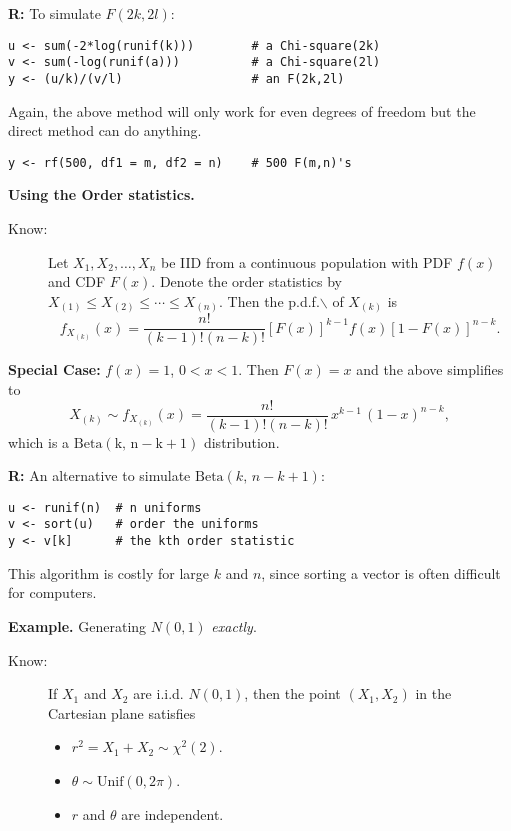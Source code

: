 \documentclass[11pt,english]{scrbook}
\begin{document}
\begin{enumerate}
\textbf{R:} To simulate \(F(2k,2l)\):
\begin{verbatim}
u <- sum(-2*log(runif(k)))        # a Chi-square(2k)
v <- sum(-log(runif(a)))          # a Chi-square(2l)
y <- (u/k)/(v/l)                  # an F(2k,2l)
\end{verbatim}

Again, the above method will only work for even degrees of freedom but the direct method can do anything.
\begin{verbatim}
y <- rf(500, df1 = m, df2 = n)    # 500 F(m,n)'s
\end{verbatim}



\textbf{Using the Order statistics.}

\begin{description}
\item[{Know:}] Let \(X_{1},X_{2},\ldots,X_{n}\) be IID from a continuous population with PDF \(f(x)\) and CDF \(F(x)\). Denote the order statistics by \(X_{(1)}\leq X_{(2)}\leq\cdots\leq X_{(n)}\). Then the p.d.f.$\backslash$ of \(X_{(k)}\) is 
\[
  f_{X_{(k)}}(x)=\frac{n!}{(k-1)!(n-k)!}[F(x)]^{k-1}f(x)[1-F(x)]^{n-k}.
  \]
\end{description}


\textbf{Special Case:} \(f(x)=1\), \(0 < x < 1\).   Then \(F(x)=x\) and the above simplifies to 
\[
X_{(k)}\sim f_{X_{(k)}}(x)=\frac{n!}{(k-1)!(n-k)!}\, x^{k-1}\,(1-x)^{n-k},
\]
which is a \(\mathrm{Beta(k,\,n-k+1)}\) distribution.

\textbf{R:} An alternative to simulate \(\mathrm{Beta}(k,\,n-k+1)\):

\begin{verbatim}
u <- runif(n)  # n uniforms
v <- sort(u)   # order the uniforms
y <- v[k]      # the kth order statistic  
\end{verbatim}

This algorithm is costly for large \(k\) and \(n\), since sorting a vector is often difficult for computers.


\textbf{Example.} Generating \(N(0,1)\) \emph{exactly}.

\begin{description}
\item[{Know:}] If \(X_{1}\) and \(X_{2}\) are i.i.d. \(N(0,1)\), then the point \((X_{1},X_{2})\) in the Cartesian plane satisfies
\begin{itemize}
\item \(r^{2}=X_{1}+X_{2}\sim\chi^{2}(2)\).
\item \(\theta \sim \mathrm{Unif}(0,2\pi)\).
\item \(r\) and \(\theta\) are independent.
\end{itemize}
\end{description}


\end{enumerate}
\end{document}
